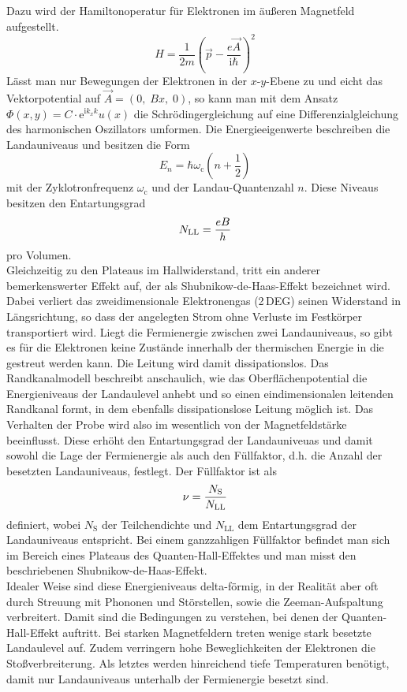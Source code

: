 \documentclass[paper=a4,fontsize=10pt,DIV=18,twocolumn,parskip=half]{scrartcl}
\numberwithin{equation}{section}    %
\begin{document}
Dazu wird der Hamiltonoperatur für Elektronen im äußeren Magnetfeld aufgestellt.
\begin{equation}
H=\frac{1}{2 m} \left(\vec{p} - \frac{e \vec{A}}{\mathrm{i} \hbar}\right)^2
\end{equation}
Lässt man nur Bewegungen der Elektronen in der $x$-$y$-Ebene zu und eicht das Vektorpotential auf  $\vec{A}= (0, \; B x, \; 0)$, so kann man mit dem Ansatz $\Phi(x,y)=C \cdot \mathrm{e}^{\mathrm{i} k_x k} u(x)$ die Schrödingergleichung auf eine Differenzialgleichung des harmonischen Oszillators umformen.
Die Energieeigenwerte beschreiben die Landauniveaus und besitzen die Form
\begin{equation}
E_n=\hbar \omega_\mathrm{c} \left(n+\frac{1}{2}\right)
\end{equation}
mit der Zyklotronfrequenz $\omega_\mathrm{c}$ und der Landau-Quantenzahl $n$. Diese Niveaus besitzen den Entartungsgrad
\begin{equation}
N_{\rm LL}= \frac{e B}{h}
\label{entartung}
\end{equation}
pro Volumen.  \\
Gleichzeitig zu den Plateaus im Hallwiderstand, tritt ein anderer bemerkenswerter Effekt auf, der als Shubnikow-de-Haas-Effekt bezeichnet wird. Dabei verliert das zweidimensionale Elektronengas (2\,DEG) seinen Widerstand in Längsrichtung, so dass der angelegten Strom ohne Verluste im Festkörper transportiert wird. Liegt die Fermienergie zwischen zwei Landauniveaus, so gibt es für die Elektronen keine Zustände innerhalb der thermischen Energie in die gestreut werden kann. Die Leitung wird damit dissipationslos. Das Randkanalmodell beschreibt anschaulich, wie das Oberflächenpotential die Energieniveaus der Landaulevel anhebt und so einen eindimensionalen leitenden Randkanal formt, in dem ebenfalls dissipationslose Leitung möglich ist.
Das Verhalten der Probe wird also im wesentlich von der Magnetfeldstärke beeinflusst. Diese erhöht den Entartungsgrad der Landauniveuas  und damit sowohl die Lage der Fermienergie als auch den Füllfaktor, d.h. die Anzahl der besetzten Landauniveaus, festlegt. Der Füllfaktor ist als
\begin{equation}
\nu=\frac{N_\mathrm{S}}{N_{\rm LL}}
\label{fuellfaktor}
\end{equation}
definiert, wobei $N_\mathrm{S}$ der Teilchendichte und $N_{\mathrm{LL}}$ dem Entartungsgrad der Landauniveaus entspricht. Bei einem ganzzahligen Füllfaktor befindet man sich im Bereich eines Plateaus des Quanten-Hall-Effektes und man misst den beschriebenen Shubnikow-de-Haas-Effekt.\\
Idealer Weise sind diese Energieniveaus delta-förmig, in der Realität aber oft durch Streuung mit Phononen und Störstellen, sowie die Zeeman-Aufspaltung verbreitert. Damit sind die Bedingungen zu verstehen, bei denen der Quanten-Hall-Effekt auftritt. Bei starken Magnetfeldern treten wenige stark besetzte Landaulevel auf. Zudem verringern hohe Beweglichkeiten der Elektronen die Stoßverbreiterung. Als letztes werden hinreichend tiefe Temperaturen benötigt, damit nur Landauniveaus unterhalb der Fermienergie besetzt sind.\\
\end{document}
